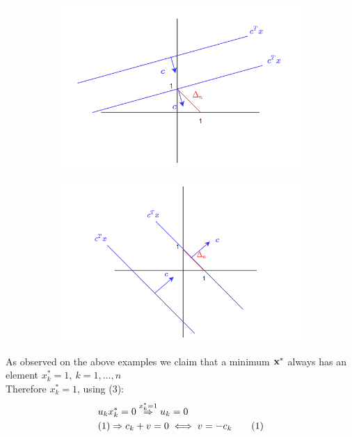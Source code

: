 \documentclass[12pt]{article}
\newcommand\numberthis{\addtocounter{equation}{1}\tag{\theequation}}	%
\begin{document}
\begin{enumerate}
			\begin{figure}[h]
				\caption{Examples ${\bf c}^T{\bf x}$ Level Sets and the minimum on $\Delta_2$}
				\centering
				\begin{subfigure}[b]{0.4\textwidth}
					\centering
					\includegraphics[width=\textwidth]{P3-fig0.png}
				\end{subfigure}
				\begin{subfigure}[b]{0.4\textwidth}
					\centering
					\includegraphics[width=\textwidth]{P3-fig1.png}
				\end{subfigure}
			\end{figure}
			
			As observed on the above examples we claim that a minimum ${\bf x^*}$ always has an element $x^*_k = 1,\ k=1,...,n$\\
			
			Therefore $x^*_k=1$, using (3): \\
			\begin{align*}
				&u_kx^*_k=0 \overset{x^*_k=1}{\Rightarrow}u_k=0\\
				&(1)\Rightarrow c_k + v=0 \iff v=-c_k\numberthis
			\end{align*}
			

\end{enumerate}
\end{document}
